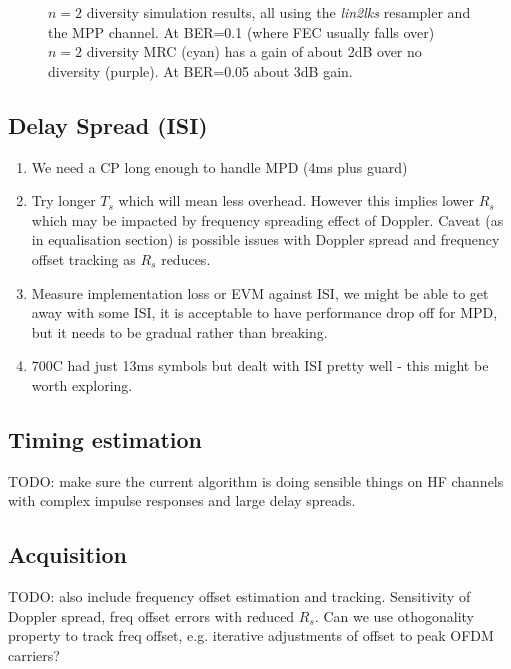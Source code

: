 \documentclass{article}
\begin{document}
\begin{figure}[h]
\caption{$n=2$ diversity simulation results, all using the \emph{lin2lks} resampler and the MPP channel. At BER=0.1 (where FEC usually falls over) $n=2$ diversity MRC (cyan) has a gain of about 2dB over no diversity (purple). At BER=0.05 about 3dB gain.}
\label{fig:equaliser_div_curves}
\begin{center}

\end{center}
\end{figure}

\subsection{Delay Spread (ISI)}

\begin{enumerate}
\item We need a CP long enough to handle MPD (4ms plus guard)
\item Try longer $T_s$ which will mean less overhead. However this implies lower $R_s$ which may be impacted by frequency spreading effect of Doppler.  Caveat (as in equalisation section) is possible issues with Doppler spread and frequency offset tracking as $R_s$ reduces.
\item Measure implementation loss or EVM against ISI, we might be able to get away with some ISI, it is acceptable to have performance drop off for MPD, but it needs to be gradual rather than breaking.
\item 700C had just 13ms symbols but dealt with ISI pretty well - this might be worth exploring.
\end{enumerate}

\subsection{Timing estimation}

TODO: make sure the current algorithm is doing sensible things on HF channels with complex impulse responses and large delay spreads.

\subsection{Acquisition}

TODO: also include frequency offset estimation and tracking.  Sensitivity of Doppler spread, freq offset errors with reduced $R_s$. Can we use othogonality property to track freq offset, e.g. iterative adjustments of offset to peak OFDM carriers?
\end{document}
